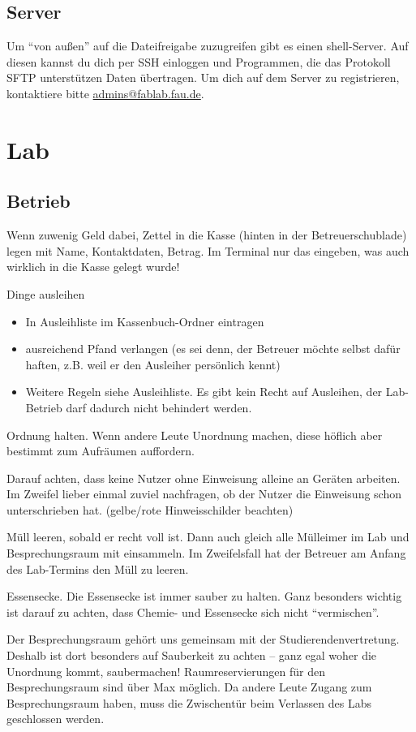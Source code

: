 \documentclass{\basedir/fablab-document}
\begin{document}
\subsection{Server}
Um \enquote{von außen} auf die Dateifreigabe zuzugreifen gibt es einen shell-Server.
Auf diesen kannst du dich per SSH einloggen und Programmen, die das Protokoll SFTP unterstützen Daten übertragen.
Um dich auf dem Server zu registrieren, kontaktiere bitte \url{admins@fablab.fau.de}.

\section{Lab}
\subsection{Betrieb}
Wenn zuwenig Geld dabei, Zettel in die Kasse (hinten in der Betreuerschublade) legen mit Name, Kontaktdaten, Betrag.
Im Terminal nur das eingeben, was auch wirklich in die Kasse gelegt wurde!

Dinge ausleihen
\begin{itemize}
 \item In Ausleihliste im Kassenbuch-Ordner eintragen
 \item ausreichend Pfand verlangen (es sei denn, der Betreuer möchte selbst dafür haften, z.B. weil er den Ausleiher persönlich kennt)
 \item Weitere Regeln siehe Ausleihliste. Es gibt kein Recht auf Ausleihen, der Lab-Betrieb darf dadurch nicht behindert werden.
\end{itemize}

Ordnung halten. Wenn andere Leute Unordnung machen, diese höflich aber bestimmt zum Aufräumen auffordern.

Darauf achten, dass keine Nutzer ohne Einweisung alleine an Geräten arbeiten. Im Zweifel lieber einmal zuviel nachfragen, ob der Nutzer die Einweisung schon unterschrieben hat. (gelbe/rote Hinweisschilder beachten)

Müll leeren, sobald er recht voll ist. Dann auch gleich alle Mülleimer im Lab und Besprechungsraum mit einsammeln. Im Zweifelsfall hat der Betreuer am Anfang des Lab-Termins den Müll zu leeren.

Essensecke. Die Essensecke ist immer sauber zu halten. Ganz besonders wichtig ist darauf zu achten, dass Chemie- und Essensecke sich nicht \enquote{vermischen}.

Der Besprechungsraum gehört uns gemeinsam mit der Studierendenvertretung. Deshalb ist dort besonders auf Sauberkeit zu achten -- ganz egal woher die Unordnung kommt, saubermachen!
Raumreservierungen für den Besprechungsraum sind über Max möglich. Da andere Leute Zugang zum Besprechungsraum haben, muss die Zwischentür beim Verlassen des Labs geschlossen werden.
\end{document}
